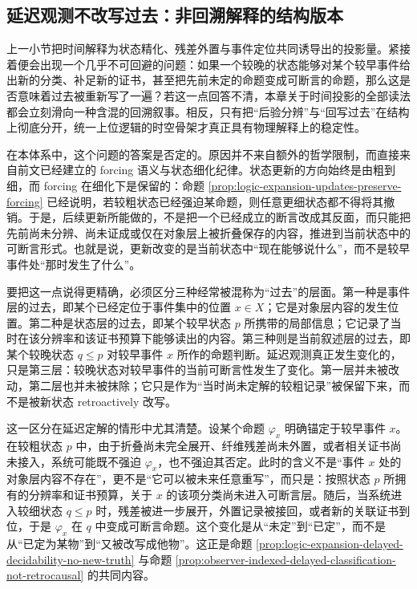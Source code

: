 \subsection{延迟观测不改写过去：非回溯解释的结构版本}\label{subsec:physical-spacetime-skeleton-nonretroactive-resolution}

上一小节把时间解释为状态精化、残差外置与事件定位共同诱导出的投影量。紧接着便会出现一个几乎不可回避的问题：如果一个较晚的状态能够对某个较早事件给出新的分类、补足新的证书，甚至把先前未定的命题变成可断言的命题，那么这是否意味着过去被重新写了一遍？若这一点回答不清，本章关于时间投影的全部读法都会立刻滑向一种含混的回溯叙事。相反，只有把“后验分辨”与“回写过去”在结构上彻底分开，统一上位逻辑的时空骨架才真正具有物理解释上的稳定性。

在本体系中，这个问题的答案是否定的。原因并不来自额外的哲学限制，而直接来自前文已经建立的 forcing 语义与状态细化纪律。状态更新的方向始终是由粗到细，而 forcing 在细化下是保留的：命题 \ref{prop:logic-expansion-updates-preserve-forcing} 已经说明，若较粗状态已经强迫某命题，则任意更细状态都不得将其撤销。于是，后续更新所能做的，不是把一个已经成立的断言改成其反面，而只能把先前尚未分辨、尚未证成或仅在对象层上被折叠保存的内容，推进到当前状态中的可断言形式。也就是说，更新改变的是当前状态中“现在能够说什么”，而不是较早事件处“那时发生了什么”。

要把这一点说得更精确，必须区分三种经常被混称为“过去”的层面。第一种是事件层的过去，即某个已经定位于事件集中的位置 \(x\in X\)；它是对象层内容的发生位置。第二种是状态层的过去，即某个较早状态 \(p\) 所携带的局部信息；它记录了当时在该分辨率和该证书预算下能够读出的内容。第三种则是当前叙述层的过去，即某个较晚状态 \(q\le p\) 对较早事件 \(x\) 所作的命题判断。延迟观测真正发生变化的，只是第三层：较晚状态对较早事件的当前可断言性发生了变化。第一层并未被改动，第二层也并未被抹除；它只是作为“当时尚未定解的较粗记录”被保留下来，而不是被新状态 retroactively 改写。

这一区分在延迟定解的情形中尤其清楚。设某个命题 \(\varphi_x\) 明确锚定于较早事件 \(x\)。在较粗状态 \(p\) 中，由于折叠尚未完全展开、纤维残差尚未外置，或者相关证书尚未接入，系统可能既不强迫 \(\varphi_x\)，也不强迫其否定。此时的含义不是“事件 \(x\) 处的对象层内容不存在”，更不是“它可以被未来任意重写”，而只是：按照状态 \(p\) 所拥有的分辨率和证书预算，关于 \(x\) 的该项分类尚未进入可断言层。随后，当系统进入较细状态 \(q\le p\) 时，残差被进一步展开，外置记录被接回，或者新的关联证书到位，于是 \(\varphi_x\) 在 \(q\) 中变成可断言命题。这个变化是从“未定”到“已定”，而不是从“已定为某物”到“又被改写成他物”。这正是命题 \ref{prop:logic-expansion-delayed-decidability-no-new-truth} 与命题 \ref{prop:observer-indexed-delayed-classification-not-retrocausal} 的共同内容。


